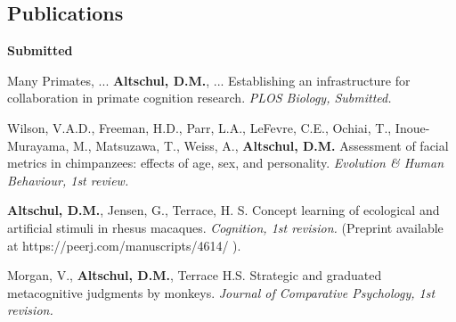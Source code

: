 \documentclass[margin,line]{res}
\begin{document}
\begin{resume}
\section{\sc Publications} 

%
%
%
%
%
%
%
%
%

{\bf Submitted}

Many Primates, ... {\bf Altschul, D.M.}, ... Establishing an infrastructure for collaboration in primate cognition research. {\it PLOS Biology, Submitted.}

Wilson, V.A.D., Freeman, H.D., Parr, L.A., LeFevre, C.E., Ochiai, T., Inoue-Murayama, M., Matsuzawa, T., Weiss, A., {\bf Altschul, D.M.} Assessment of facial metrics in chimpanzees: effects of age, sex, and personality. {\it Evolution \& Human Behaviour, 1st review.}

{\bf Altschul, D.M.}, Jensen, G.,  Terrace, H. S. Concept learning of ecological and artificial stimuli in rhesus macaques. {\it Cognition, 1st revision.} (Preprint available at https://peerj.com/manuscripts/4614/ ).

Morgan, V., {\bf Altschul, D.M.}, Terrace H.S. Strategic and graduated metacognitive judgments by monkeys.  {\it Journal of Comparative Psychology, 1st revision.}


\end{resume}
\end{document}
